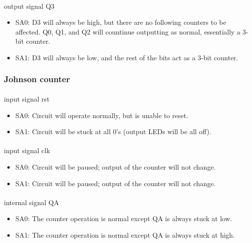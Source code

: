 \documentclass{article}
\begin{document}
  	\paragraph{} output signal Q3
  	\begin{itemize}
  		\item SA0: D3 will always be high, but there are no following counters to be affected. Q0, Q1, and Q2 will countinue outputting as normal, essentially a 3-bit counter.
  		\item SA1: D3 will always be low, and the rest of the bits act as a 3-bit counter.
  	\end{itemize}

  \subsubsection{Johnson counter}
	\paragraph{} input signal rst
	\begin{itemize}
		\item SA0: Circuit will operate normally, but is unable to reset.
		\item SA1: Circuit will be stuck at all 0’s (output LEDs will be all off).
	\end{itemize}

	\paragraph{} input signal clk
	\begin{itemize}
		\item SA0: Circuit will be paused; output of the counter will not change.
		\item SA1: Circuit will be paused; output of the counter will not change.
	\end{itemize}

	\paragraph{} internal signal QA
	\begin{itemize}
		\item SA0: The counter operation is normal except QA is always stuck at low.
		\item SA1: The counter operation is normal except QA is always stuck at high.
	\end{itemize}
\end{document}
